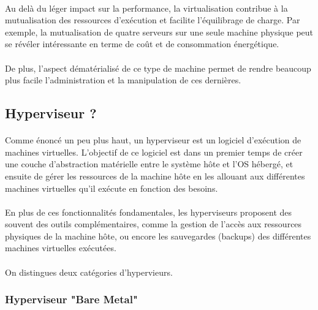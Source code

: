 \paragraph{} Au delà du léger impact sur la performance, la virtualisation
contribue à la mutualisation des ressources d'exécution et facilite
l'équilibrage de charge. Par exemple, la mutualisation de quatre serveurs sur
une seule machine physique peut se révéler intéressante en terme de coût et de
consommation énergétique.

\paragraph{} De plus, l'aspect dématérialisé de ce type de machine permet de
rendre beaucoup plus facile l'administration et la manipulation de ces
dernières.

\subsection{Hyperviseur ?}

\paragraph{} Comme énoncé un peu plus haut, un hyperviseur est un logiciel
d'exécution de machines virtuelles. L'objectif de ce logiciel est dans un
premier temps de créer une couche d'abstraction matérielle entre le système hôte
et l'OS hébergé, et ensuite de gérer les ressources de la machine hôte en les
allouant aux différentes machines virtuelles qu'il exécute en fonction des
besoins.

\paragraph{} En plus de ces fonctionnalités fondamentales, les hyperviseurs
proposent des souvent des outils complémentaires, comme la gestion de l'accès aux
ressources physiques de la machine hôte, ou encore les sauvegardes (backups) des
différentes machines virtuelles exécutées.

\paragraph{} On distingues deux catégories d'hypervieurs.

\subsubsection{Hyperviseur "Bare Metal"}

